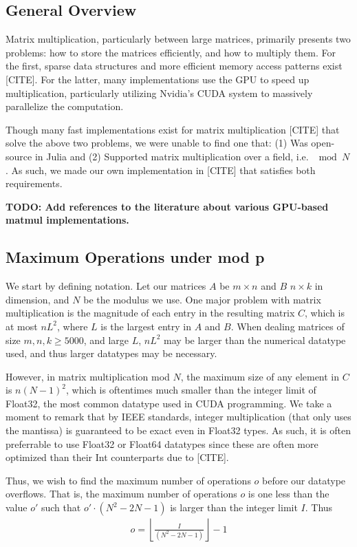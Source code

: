 
\subsection{General Overview}

Matrix multiplication, particularly between large matrices, primarily presents two problems: how to store the matrices efficiently, and how to multiply them. For the first, sparse data structures and more efficient memory access patterns exist [CITE]. For the latter, many implementations use the GPU to speed up multiplication, particularly utilizing Nvidia's CUDA system to massively parallelize the computation.

Though many fast implementations exist for matrix multiplication [CITE] that solve the above two problems, we were unable to find one that: (1) Was open-source in Julia and (2) Supported matrix multiplication over a field, i.e. $\mod N$. As such, we made our own implementation in [CITE] that satisfies both requirements.

\textbf{TODO: Add references to the literature about various GPU-based matmul implementations.}

\subsection{Maximum Operations under mod p}

We start by defining notation. Let our matrices $A$ be $m \times n$ and $B$ $n \times k$ in dimension, and $N$ be the modulus we use. One major problem with matrix multiplication is the magnitude of each entry in the resulting matrix $C$, which is at most $n L^2$, where $L$ is the largest entry in $A$ and $B$. When dealing matrices of size $m,n,k \geq 5000$, and large $L$, $n L^2$ may be larger than the numerical datatype used, and thus larger datatypes may be necessary.

However, in matrix multiplication mod $N$, the maximum size of any element in $C$ is $n (N-1)^2$, which is oftentimes much smaller than the integer limit of Float32, the most common datatype used in CUDA programming. We take a moment to remark that by IEEE standards, integer multiplication (that only uses the mantissa) is guaranteed to be exact even in Float32 types. As such, it is often preferrable to use Float32 or Float64 datatypes since these are often more optimized than their Int counterparts due to [CITE].

Thus, we wish to find the maximum number of operations $o$ before our datatype overflows. That is, the maximum number of operations $o$ is one less than the value $o'$ such that $o' \cdot (N^2 - 2N - 1)$ is larger than the integer limit $I$. Thus
\begin{align*}
    o = \left\lfloor \frac{I}{(N^2 - 2N - 1)} \right\rfloor - 1
\end{align*}


